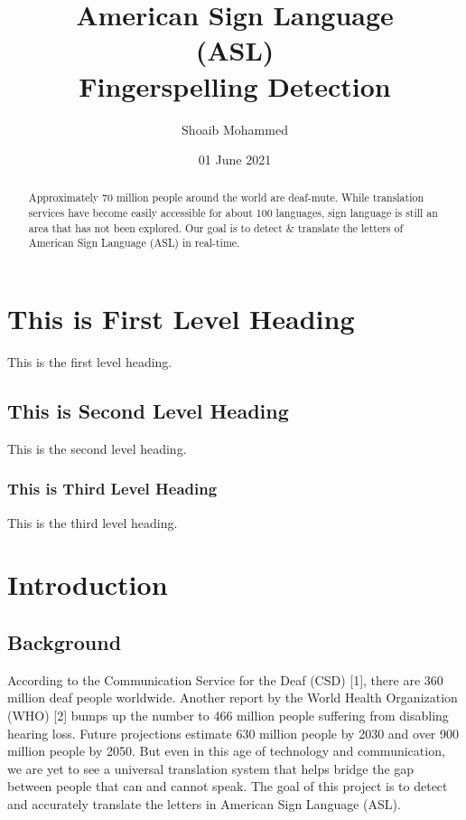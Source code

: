 \documentclass[12pt]{article}
\title{American Sign Language\\
	(ASL)\\
	Fingerspelling Detection}
\author{Shoaib Mohammed}
\date{01 June 2021}
\begin{document}
\begin{titlepage}
\maketitle
\thispagestyle{empty}
\end{titlepage}

\begin{abstract}
	Approximately 70 million people around the world are deaf-mute. While 
	translation services have become easily accessible for about 100 
	languages, sign language is still an area that has not been explored. 
	Our goal is to detect \& translate the letters of American Sign Language 
	(ASL) in real-time.
\end{abstract}

\section{This is First Level Heading}
This is the first level heading.

\subsection{This is Second Level Heading}
This is the second level heading.

\subsubsection{This is Third Level Heading}
This is the third level heading.

\section{Introduction}

\subsection{Background}
According to the Communication Service for the Deaf (CSD) [1], there are 360 
million deaf people worldwide. Another report by the World Health 
Organization (WHO) [2] bumps up the number to 466 million people suffering 
from disabling hearing loss. Future projections estimate 630 million people by 
2030 and over 900 million people by 2050. But even in this age of technology 
and communication, we are yet to see a universal translation system that helps 
bridge the gap between people that can and cannot speak. The goal of this 
project is to detect and accurately translate the letters in American Sign 
Language (ASL).
\end{document}
